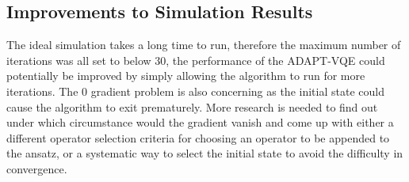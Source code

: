 \subsection{Improvements to Simulation Results}
The ideal simulation takes a long time to run, therefore the maximum number of iterations was all set to below $ 30 $, the performance of the ADAPT-VQE could potentially be improved by simply allowing the algorithm to run for more iterations. The $ 0 $ gradient problem is also concerning as the initial state could cause the algorithm to exit prematurely. More research is needed to find out under which circumstance would the gradient vanish and come up with either a different operator selection criteria for choosing an operator to be appended to the ansatz, or a systematic way to select the initial state to avoid the difficulty in convergence.

